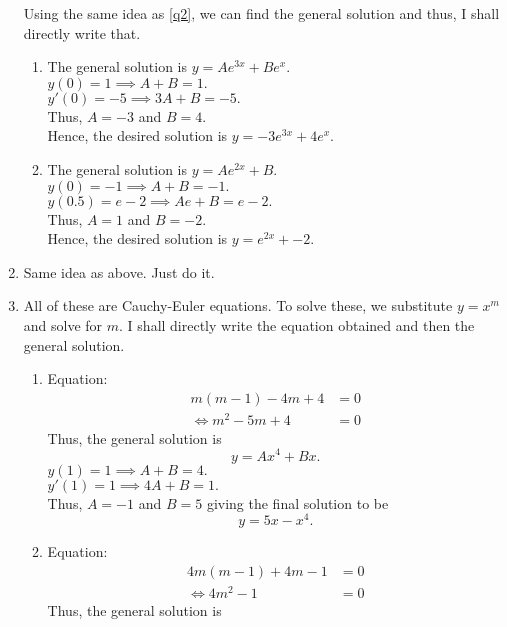 \documentclass{article}
\begin{document}
\begin{enumerate}[label = Q.\arabic*.]
	Using the same idea as \ref{q2}, we can find the general solution and thus, I shall directly write that.
	\begin{enumerate}[label = (\roman*)] 
		\item The general solution is $y = Ae^{3x} + Be^x.$\\
		$y(0) = 1 \implies A + B = 1.$\\
		$y'(0) = -5 \implies 3A + B = -5.$\\
		Thus, $A = -3$ and $B = 4.$\\
		Hence, the desired solution is $y = -3e^{3x} + 4e^x.$
		\item The general solution is $y = Ae^{2x} + B.$\\
		$y(0) = -1 \implies A + B = -1.$\\
		$y(0.5) = e - 2 \implies Ae + B = e-2.$\\
		Thus, $A = 1$ and $B = -2.$\\
		Hence, the desired solution is $y = e^{2x} + -2.$
	\end{enumerate}
	\item Same idea as above. Just do it. \checkmark
	\item \label{q8} All of these are Cauchy-Euler equations. To solve these, we substitute $y = x^m$ and solve for $m.$ I shall directly write the equation obtained and then the general solution.
	\begin{enumerate}[label = (\roman*)] 
		\item Equation:
		\begin{align*} 
			m(m - 1) - 4m + 4 &= 0\\
			\iff m^2 - 5m + 4 &= 0
		\end{align*}
		Thus, the general solution is
		\begin{equation*} 
			y = Ax^4 + Bx.
		\end{equation*}
		$y(1) = 1 \implies A + B = 4.$\\
		$y'(1) = 1 \implies 4A + B = 1.$\\
		Thus, $A = -1$ and $B = 5$ giving the final solution to be
		\begin{equation*} 
			y = 5x -x^4.
		\end{equation*}
		\item Equation:
		\begin{align*} 
			4m(m - 1) + 4m - 1 &= 0\\
			\iff 4m^2 - 1 &= 0
		\end{align*}
		Thus, the general solution is
		\begin{equation*} 

\end{equation*}
\end{enumerate}
\end{enumerate}
\end{document}
